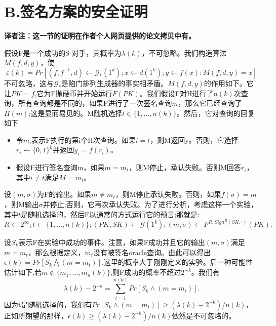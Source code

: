 \documentclass[]{article}
\begin{document}
 \section*{B.签名方案的安全证明}
    \vspace{0.5cm}
    \textbf{译者注：这一节的证明在作者个人网页提供的论文拷贝中有。}\par
    \vspace{0.5cm}
    假设F是一个成功的S-对手，其概率为$\lambda(k)$，不可忽略。我们构造算法$M(f,d,y)$，使
    \[\varepsilon (k)=Pr[(f,f^{-1},d)\leftarrow \mathcal{G}_* (1^k);x\leftarrow d(1^k);y\leftarrow f(x):M(f,d,y)=x]\]
    不可忽略，这与$\mathcal{G}_*$是陷门排列生成器的事实相矛盾。$M(f,d,y)$的作用如下。它让$PK = f$,它为F抛硬币并开始运行$F(PK)$。我们假设F对H进行了$n(k)$次查询，所有查询都是不同的，如果F进行了一次签名查询$m$，那么它已经查询了$H(m)$;这是显而易见的。M随机选择$t\in\{1,\ldots,n(k)\}$。然后，它对查询的回复如下
    \begin{itemize}
    	\item 令$m_i$表示F执行的第i个H次查询。如果$i = t$，则M返回y。否则，它选择$r_i\leftarrow \{0,1\}^k$并返回$y_i = f(r_i)$。
    	\item 假设F进行签名查询m，如果$m = m_t$，则M停止，承认失败。否则M回答$r_i$，其中$i\neq t$满足$M = m_i$。
    \end{itemize}

	设$(m,\sigma)$为F的输出。如果$m \neq m_t$，则M停止承认失败。否则，如果$f(\sigma) = m$，则M输出$\sigma$并停止;否则，它再次承认失败。为了进行分析，考虑这样一个实验，其中$t$是随机选择的，然后F以通常的方式运行它的预言;那就是:
	\[R\leftarrow 2^\infty ;t\leftarrow \{1,\ldots,n(k)\};(PK,SK)\leftarrow \mathcal{G}(1^k);(m,\sigma)\leftarrow F^{R,Sign^R(SK,\cdot)}(PK).\]
	
	
	设$S_k$表示F在实验中成功的事件。注意，如果F成功并且它的输出$(m,\sigma)$满足$m = m_t$，那么根据定义，$m_t$没有被签名oracle查询。由此可以得出$\epsilon(k) = Pr[S_k\bigwedge (m = m_t)]$,这里的概率大于刚刚定义的实验。后一种可能性估计如下,若$m\notin\{m_1,\ldots,m_n(k)\}$,则F成功的概率不超过$2^{-k}$。我们有
	\[\lambda(k)-2^{-k}=\sum_{i=1}^{n(k)}Pr[S_k \wedge (m=m_i)].\]
	因为t是随机选择的，我们有$Pr[S_k\wedge (m=m_t)]\geq (\lambda(k)-2^{-k})/n(k)$，正如所期望的那样，$\epsilon(k)\geq (\lambda(k)-2^{-k})/n(k)$依然是不可忽略的。
\end{document}
